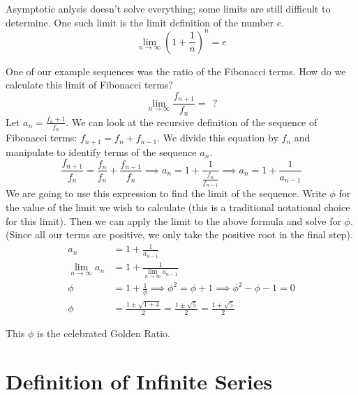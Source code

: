 \documentclass[fleqn,letterpaper]{report}
\begin{document}
\begin{example}Asymptotic anlysis doesn't solve everything;
some limits are still difficult to determine. 
One such limit is the limit definition of the number $e$.
\begin{equation*}
\lim_{n \rightarrow \infty} \left( 1 + \frac{1}{n} \right)^n = e 
\end{equation*}
\end{example}

\begin{example}One of our example sequences was the ratio of
the Fibonacci terms. How do we calculate this limit of
Fibonacci terms?
\begin{equation*}
\lim_{n \rightarrow \infty} \frac{f_{n+1}}{f_n} = \ \ ?
\end{equation*}
Let $a_n = \frac{f_n+1}{f_n}$. We can look at the recursive
definition of the sequence of Fibonacci terms: $f_{n+1} = f_{n}
+ f_{n-1}$. We divide this equation by $f_n$ and manipulate to
identify terms of the sequence $a_n$. 
\begin{equation*}
\frac{f_{n+1}}{f_n} = \frac{f_n}{f_n} + \frac{f_{n-1}}{f_n}
\implies 
a_n = 1 + \frac{1}{\frac{f_n}{f_{n-1}}} \implies
a_n = 1 + \frac{1}{a_{n-1}}
\end{equation*}
We are going to use this expression to find the limit of the
sequence. Write $\phi$ for the value of the limit we wish to calculate
(this is a traditional notational choice for this limit). Then
we can apply the limit to the above formula and solve for
$\phi$. (Since all our terms are
positive, we only take the positive root in the final step).
\begin{align*}
a_n & = 1 + \frac{1}{a_{n-1}} \\
\lim_{n \rightarrow \infty} a_n & = 1 + 
\frac{1}{\lim_{n \rightarrow \infty} a_{n-1}} \\
\phi & = 1 + \frac{1}{\phi} \implies 
\phi^2 = \phi + 1 \implies
\phi^2 - \phi - 1 = 0 \\
\phi & = \frac{1 \pm \sqrt{1+4}}{2} = \frac{1 \pm
\sqrt{5}}{2} = \frac{1 + \sqrt{5}}{2}
\end{align*}
\end{example}

This $\phi$ is the celebrated Golden Ratio.

\section{Definition of Infinite Series}
\label{series-definition}
\end{document}
